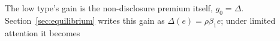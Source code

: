 The low type's gain is the non-disclosure premium itself, $g_0=\Delta$. Section~\ref{sec:equilibrium} writes this gain as $\Delta(e)=\rho\beta_1e$; under limited attention it becomes
